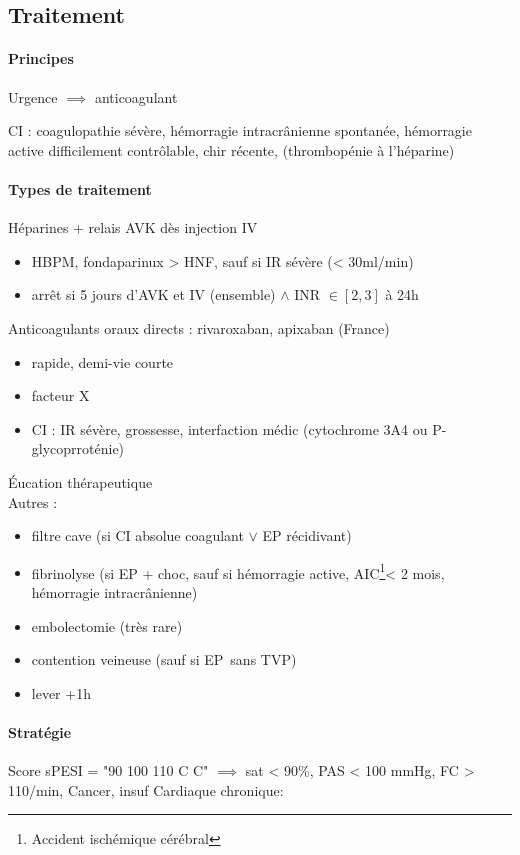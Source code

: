 \documentclass{article}
\begin{document}
\subsection{Traitement}
\paragraph{Principes}
Urgence \skull $\implies$ anticoagulant

CI : coagulopathie sévère, hémorragie intracrânienne spontanée, hémorragie
active difficilement contrôlable, chir récente, (thrombopénie à l'héparine)

\paragraph{Types de traitement}
Héparines + relais AVK dès injection IV
\begin{itemize}
  \item HBPM, fondaparinux > HNF, sauf si IR sévère (< 30ml/min)
  \item arrêt si 5 jours d'AVK et IV (ensemble) $\wedge$ INR $\in [2,3]$ à 24h
\end{itemize}
Anticoagulants oraux directs : rivaroxaban, apixaban (France)
\begin{itemize}
  \item rapide, demi-vie courte
  \item facteur X
  \item CI : IR sévère, grossesse, interfaction médic (cytochrome 3A4 ou
    P-glycoprroténie)
\end{itemize}
Éucation thérapeutique\\
Autres :
\begin{itemize}
  \item filtre cave (si CI absolue coagulant $\vee$ EP récidivant)
  \item fibrinolyse (si EP + choc, sauf si hémorragie active,
    AIC\footnote{Accident ischémique cérébral}< 2 mois,
    hémorragie intracrânienne)
  \item embolectomie (très rare)
  \item contention veineuse (sauf si EP sans TVP)
  \item lever +1h
\end{itemize}

\paragraph{Stratégie}
Score sPESI = "90 100 110 C C" $\implies$ sat < 90\%, PAS < 100 mmHg, FC >
110/min, Cancer, insuf Cardiaque chronique:
\end{document}
